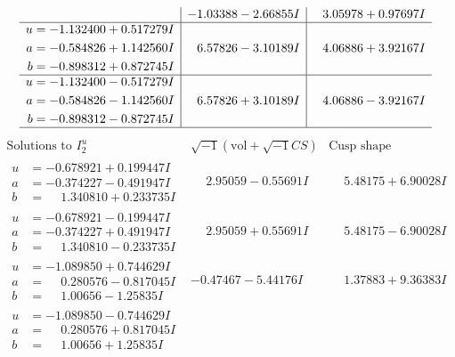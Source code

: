 \documentclass[1p]{elsarticle_modified}
\theoremstyle{definition}
\newcommand{\I}{\sqrt{-1}}
\begin{document}
$$\begin{array}{c|c|c}
 & -1.03388 - 2.66855 I & \phantom{-}3.05978 + 0.97697 I \\ \hline\begin{aligned}
u &= -1.132400 + 0.517279 I \\
a &= -0.584826 + 1.142560 I \\
b &= -0.898312 + 0.872745 I\end{aligned}
 & \phantom{-}6.57826 - 3.10189 I & \phantom{-}4.06886 + 3.92167 I \\ \hline\begin{aligned}
u &= -1.132400 - 0.517279 I \\
a &= -0.584826 - 1.142560 I \\
b &= -0.898312 - 0.872745 I\end{aligned}
 & \phantom{-}6.57826 + 3.10189 I & \phantom{-}4.06886 - 3.92167 I\\
 \hline 
 \end{array}$$\newpage$$\begin{array}{c|c|c}  
\text{Solutions to }I^u_{2}& \I (\text{vol} + \sqrt{-1}CS) & \text{Cusp shape}\\
 \hline 
\begin{aligned}
u &= -0.678921 + 0.199447 I \\
a &= -0.374227 - 0.491947 I \\
b &= \phantom{-}1.340810 + 0.233735 I\end{aligned}
 & \phantom{-}2.95059 - 0.55691 I & \phantom{-}5.48175 + 6.90028 I \\ \hline\begin{aligned}
u &= -0.678921 - 0.199447 I \\
a &= -0.374227 + 0.491947 I \\
b &= \phantom{-}1.340810 - 0.233735 I\end{aligned}
 & \phantom{-}2.95059 + 0.55691 I & \phantom{-}5.48175 - 6.90028 I \\ \hline\begin{aligned}
u &= -1.089850 + 0.744629 I \\
a &= \phantom{-}0.280576 - 0.817045 I \\
b &= \phantom{-}1.00656 - 1.25835 I\end{aligned}
 & -0.47467 - 5.44176 I & \phantom{-}1.37883 + 9.36383 I \\ \hline\begin{aligned}
u &= -1.089850 - 0.744629 I \\
a &= \phantom{-}0.280576 + 0.817045 I \\
b &= \phantom{-}1.00656 + 1.25835 I\end{aligned}

\end{array}$$
\end{document}
